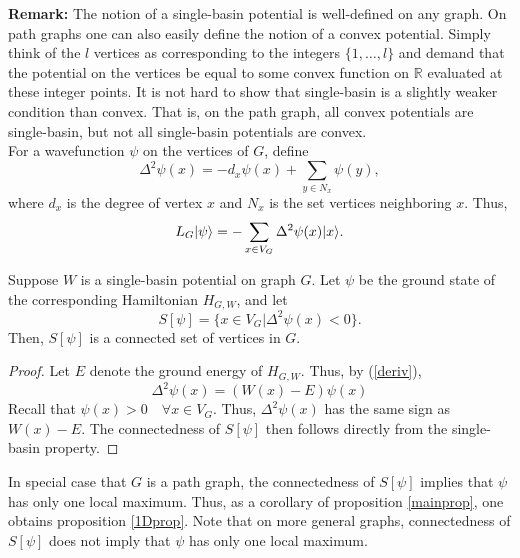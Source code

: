 \noindent
\textbf{Remark:} The notion of a single-basin potential is
well-defined on any graph. On path graphs one can also easily
define the notion of a convex potential. Simply think of the $l$
vertices as corresponding to the integers $\{1,\ldots,l\}$ and demand
that the potential on the vertices be equal to some convex function on
$\mathbb{R}$ evaluated at these integer points. It is not hard to show
that single-basin is a slightly weaker condition than convex. That is,
on the path graph, all convex potentials are single-basin, but not all
single-basin potentials are convex. \\

For a wavefunction $\psi$ on the vertices of $G$, define
\begin{equation}
\Delta^2 \psi(x) = - d_x \psi(x) + \sum_{y \in N_x} \psi(y),
\end{equation}
where $d_x$ is the degree of vertex $x$ and $N_x$ is the set vertices
neighboring $x$. Thus, 
\begin{equation}
\label{deriv}
L_G |\psi\rangle = -\sum_{x \in V_G} \Delta^2 \psi(x) |x\rangle.
\end{equation}

\begin{lem}
Suppose $W$ is a single-basin potential on graph $G$. Let $\psi$ be
the ground state of the corresponding Hamiltonian $H_{G,W}$, and let
\begin{equation}
S[\psi] = \{x \in V_G| \Delta^2 \psi(x) < 0 \}.
\end{equation}
Then, $S[\psi]$ is a connected set of vertices in $G$.
\end{lem}

\noindent
\begin{proof}
Let $E$ denote the ground energy of $H_{G,W}$. Thus, by (\ref{deriv}),
\begin{equation}
\Delta^2 \psi(x) = (W(x)- E) \psi(x)
\end{equation}
Recall that $\psi(x) > 0 \quad \forall x \in V_G$. Thus, $\Delta^2
\psi(x)$ has the same sign as $W(x)- E$. The connectedness of
$S[\psi]$ then follows directly from the single-basin property.
\end{proof}

In special case that $G$ is a path graph, the connectedness
of $S[\psi]$ implies that $\psi$ has only one local
maximum. Thus, as a corollary of proposition \ref{mainprop}, one
obtains proposition \ref{1Dprop}. Note that on more general graphs,
connectedness of $S[\psi]$ does not imply that $\psi$ has only one
local maximum.

